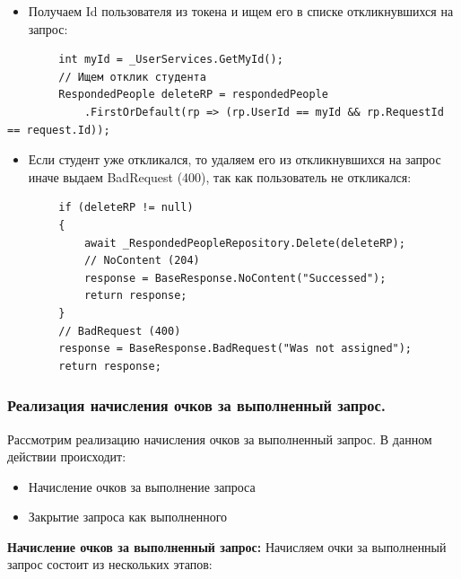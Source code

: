 \begin{itemize}
	\item{Получаем Id пользователя из токена и ищем его в списке откликнувшихся на запрос:}
\end{itemize}
\begin{verbatim}
        int myId = _UserServices.GetMyId();
        // Ищем отклик студента
        RespondedPeople deleteRP = respondedPeople
            .FirstOrDefault(rp => (rp.UserId == myId && rp.RequestId == request.Id));

\end{verbatim}

\begin{itemize}
	\item{Если студент уже откликался, то удаляем его из откликнувшихся на запрос иначе выдаем BadRequest (400), так как пользователь не откликался:}
\end{itemize}
\begin{verbatim}
        if (deleteRP != null)
        {
            await _RespondedPeopleRepository.Delete(deleteRP);
            // NoContent (204)
            response = BaseResponse.NoContent("Successed");
            return response;
        }
        // BadRequest (400)
        response = BaseResponse.BadRequest("Was not assigned");
        return response;
\end{verbatim}

\subsubsection{Реализация начисления очков за выполненный запрос.}

Рассмотрим реализацию начисления очков за выполненный запрос. В данном действии происходит:
\begin{itemize}
	\item{Начисление очков за выполнение запроса}
	\item{Закрытие запроса как выполненного}
\end{itemize}

\textbf{Начисление очков за выполненный запрос:} Начисляем очки за выполненный запрос состоит из нескольких этапов:

